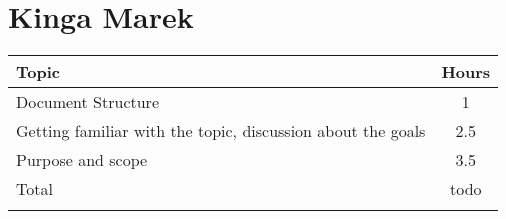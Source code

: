 \section*{Kinga Marek}
\begin{table}[H]
    \centering
    \begin{tabular}{lc} \Xhline{1.5pt}
        Topic &  Hours \\ \hline
        Document Structure & 1 \\ 
        Getting familiar with the topic, discussion about the goals & 2.5 \\ 
        Purpose and scope & 3.5 \\ \hline
        Total &  todo \\ \Xhline{1.5pt}
    \end{tabular}
\end{table}